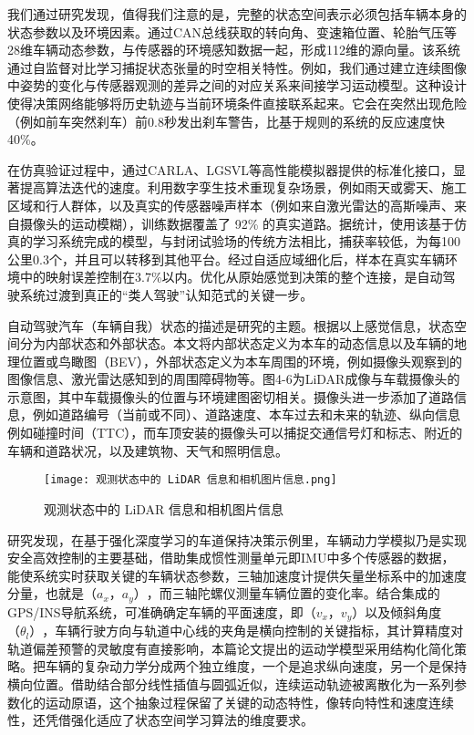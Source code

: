 我们通过研究发现，值得我们注意的是，完整的状态空间表示必须包括车辆本身的状态参数以及环境因素。通过CAN总线获取的转向角、变速箱位置、轮胎气压等28维车辆动态参数，与传感器的环境感知数据一起，形成112维的源向量。该系统通过自监督对比学习捕捉状态张量的时空相关特性。例如，我们通过建立连续图像中姿势的变化与传感器观测的差异之间的对应关系来间接学习运动模型。这种设计使得决策网络能够将历史轨迹与当前环境条件直接联系起来。它会在突然出现危险（例如前车突然刹车）前0.8秒发出刹车警告，比基于规则的系统的反应速度快40\%。

在仿真验证过程中，通过CARLA、LGSVL等高性能模拟器提供的标准化接口，显著提高算法迭代的速度。利用数字孪生技术重现复杂场景，例如雨天或雾天、施工区域和行人群体，以及真实的传感器噪声样本（例如来自激光雷达的高斯噪声、来自摄像头的运动模糊），训练数据覆盖了 92\% 的真实道路。据统计，使用该基于仿真的学习系统完成的模型，与封闭试验场的传统方法相比，捕获率较低，为每100公里0.3个，并且可以转移到其他平台。经过自适应域细化后，样本在真实车辆环境中的映射误差控制在3.7\%以内。优化从原始感觉到决策的整个连接，是自动驾驶系统过渡到真正的“类人驾驶”认知范式的关键一步。


自动驾驶汽车（车辆自我）状态的描述是研究的主题。根据以上感觉信息，状态空间分为内部状态和外部状态。本文将内部状态定义为本车的动态信息以及车辆的地理位置或鸟瞰图（BEV），外部状态定义为本车周围的环境，例如摄像头观察到的图像信息、激光雷达感知到的周围障碍物等。图4-6为LiDAR成像与车载摄像头的示意图，其中车载摄像头的位置与环境建图密切相关。摄像头进一步添加了道路信息，例如道路编号（当前或不同）、道路速度、本车过去和未来的轨迹、纵向信息例如碰撞时间（TTC），而车顶安装的摄像头可以捕捉交通信号灯和标志、附近的车辆和道路状况，以及建筑物、天气和照明信息。

\begin{figure}[hbt]
	\centering
	\texttt{[image: 观测状态中的 LiDAR 信息和相机图片信息.png]}
	\caption{观测状态中的 LiDAR 信息和相机图片信息}
	\label{f.example}
\end{figure}

研究发现，在基于强化深度学习的车道保持决策示例里，车辆动力学模拟乃是实现安全高效控制的主要基础，借助集成惯性测量单元即IMU中多个传感器的数据，能使系统实时获取关键的车辆状态参数，三轴加速度计提供矢量坐标系中的加速度分量，也就是\(（a_x，a_y）\)，而三轴陀螺仪测量车辆位置的变化率。结合集成的GPS/INS导航系统，可准确确定车辆的平面速度，即\(（v_x，v_y）\)以及倾斜角度\(（θ_l）\)，车辆行驶方向与轨道中心线的夹角是横向控制的关键指标，其计算精度对轨道偏差预警的灵敏度有直接影响，本篇论文提出的运动学模型采用结构化简化策略。把车辆的复杂动力学分成两个独立维度，一个是追求纵向速度，另一个是保持横向位置。借助结合部分线性插值与圆弧近似，连续运动轨迹被离散化为一系列参数化的运动原语，这个抽象过程保留了关键的动态特性，像转向特性和速度连续性，还凭借强化适应了状态空间学习算法的维度要求。

